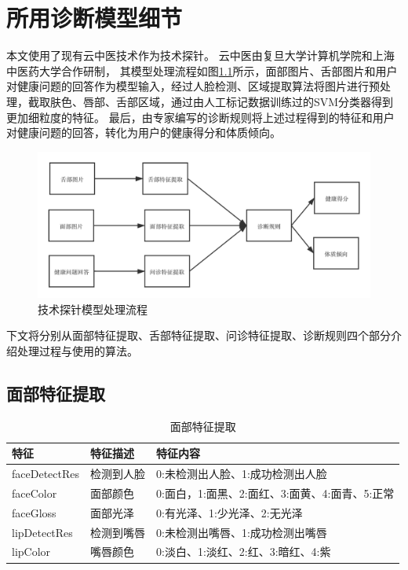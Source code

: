 \appendix
\addappheadtotoc
\chapter{所用诊断模型细节}
\label{ch:appendix}

本文使用了现有云中医技术作为技术探针。
云中医由复旦大学计算机学院和上海中医药大学合作研制，
其模型处理流程如图\ref{fig:cloudmed2}所示，面部图片、舌部图片和用户对健康问题的回答作为模型输入，经过人脸检测、区域提取算法将图片进行预处理，截取肤色、唇部、舌部区域，通过由人工标记数据训练过的SVM分类器得到更加细粒度的特征。
最后，由专家编写的诊断规则将上述过程得到的特征和用户对健康问题的回答，转化为用户的健康得分和体质倾向。

\begin{figure}[htb]
    \centering
    \includegraphics[width=15cm]{images/cloud_med3.png}
    \caption{技术探针模型处理流程}
    \label{fig:cloudmed2}
\end{figure}

下文将分别从面部特征提取、舌部特征提取、问诊特征提取、诊断规则四个部分介绍处理过程与使用的算法。

\section{面部特征提取}
\label{subsec:face_feature}

\begin{table}[h]
    \centering
    \caption{面部特征提取}
    \begin{tabular}{lll}
        \toprule
        特征          & 特征描述     & 特征内容 \\
        \midrule
        faceDetectRes & 检测到人脸   & 0:未检测出人脸、1:成功检测出人脸  \\
        faceColor     & 面部颜色 & 0:面白，1:面黑、2:面红、3:面黄、4:面青、5:正常 \\
        faceGloss     & 面部光泽 & 0:有光泽、1:少光泽、2:无光泽\\
        lipDetectRes  & 检测到嘴唇   & 0:未检测出嘴唇、1:成功检测出嘴唇\\
        lipColor      & 嘴唇颜色 & 0:淡白、1:淡红、2:红、3:暗红、4:紫   \\
        \bottomrule
    \end{tabular}
    \label{tab:face-feature}
\end{table}

